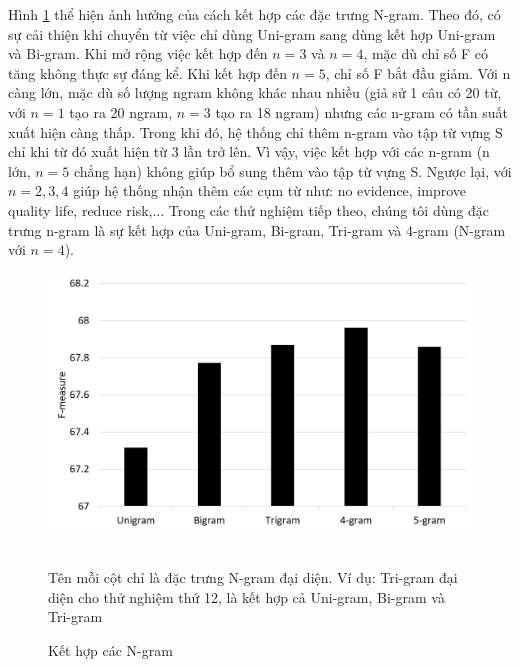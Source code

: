 Hình \ref{fig:ket-hop-ngram} thể hiện ảnh hưởng của cách kết hợp các đặc trưng N-gram. Theo đó, có sự cải thiện khi chuyển từ việc chỉ dùng Uni-gram sang dùng kết hợp Uni-gram và Bi-gram. Khi mở rộng việc kết hợp đến $n=3$ và $n=4$, mặc dù chỉ số F có tăng không thực sự đáng kể. Khi kết hợp đến $n=5$, chỉ số F bắt đầu giảm. Với n càng lớn, mặc dù số lượng ngram không khác nhau nhiều (giả sử 1 câu có 20 từ, với $n=1$ tạo ra 20 ngram, $n=3$ tạo ra 18 ngram) nhưng các n-gram có tần suất xuất hiện càng thấp. Trong khi đó, hệ thống chỉ thêm n-gram vào tập từ vựng S chỉ khi từ đó xuất hiện từ 3 lần trở lên. Vì vậy, việc kết hợp với các n-gram (n lớn, $n=5$ chẳng hạn) không giúp bổ sung thêm vào tập từ vựng S. Ngược lại, với $n=2, 3, 4$ giúp hệ thống nhận thêm các cụm từ như: no evidence, improve quality life, reduce risk,... Trong các thử nghiệm tiếp theo, chúng tôi dùng đặc trưng n-gram là sự kết hợp của Uni-gram, Bi-gram, Tri-gram và 4-gram (N-gram với $n=4$).
\begin{figure}[H]
\centering
\begin{minipage}{0.7\textwidth}
\includegraphics[scale=0.25]{../hinh/ket_hop_ngram.png}
{\footnotesize \\
Tên mỗi cột chỉ là đặc trưng N-gram đại diện. Ví dụ: Tri-gram đại diện cho thử nghiệm thứ 12, là kết hợp cả Uni-gram, Bi-gram và Tri-gram \par}
\caption{Kết hợp các N-gram} \label{fig:ket-hop-ngram}
\end{minipage}
\end{figure}

